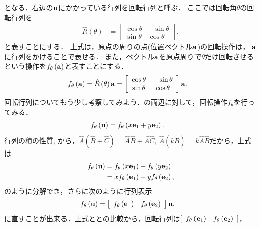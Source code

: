 %
となる．右辺の${\bf u}$にかかっている行列を回転行列と呼ぶ．
ここでは回転角$\theta$の回転行列を
\begin{align}
\hat{R}\left(\theta\right) & =\left[\begin{array}{cc}
\cos\theta & -\sin\theta\\
\sin\theta & \cos\theta
\end{array}\right], 
\end{align}
と表すことにする．
上式は，原点の周りの点(位置ベクトル${\bf a}$)の回転操作は，
${\bf a}$に行列をかけることで表せる．
また，ベクトル${\bf a}$を原点周りで$\theta$だけ回転させるという操作を$f_{\theta}\left({\bf a}\right)$と表すことにする．
\begin{align}
f_{\theta}\left({\bf a}\right) & = \hat{R}\left(\theta\right) {\bf a} 
=\left[\begin{array}{cc}
\cos\theta & -\sin\theta\\
\sin\theta & \cos\theta
\end{array}\right]{\bf a}. \label{LA:ftheta}
\end{align}
回転行列についてもう少し考察してみよう．の両辺に対して，回転操作$f_{\theta}$を行ってみる．
\begin{align}
f_{\theta}\left({\bf u}\right) & =f_{\theta}\left(x{\bf e}_{1}+y{\bf e}_{2}\right).
\end{align}
行列の積の性質, から，$\hat{A}\left(\hat{B}+\hat{C}\right) = \hat{A}\hat{B} + \hat{A}\hat{C},~\hat{A}\left(k\hat{B}\right) = k\hat{A}\hat{B}$だから，上式は
\begin{align}
f_{\theta}\left({\bf u}\right) 
& = f_{\theta}\left(x{\bf e}_{1}\right) +  f_{\theta}\left(y{\bf e}_{2}\right)\notag\\
& = xf_{\theta}\left({\bf e}_{1}\right)+yf_{\theta}\left({\bf e}_{2}\right),
\end{align}
のように分解でき，さらに次のように行列表示
\begin{align}
f_{\theta}\left({\bf u}\right) & =
\left[\begin{array}{cc} f_{\theta}\left({\bf e}_{1}\right) & f_{\theta}\left({\bf e}_{2}\right)\end{array}\right]{\bf u}, \label{LA:ftheta_unitconv}
\end{align}
に直すことが出来る．上式ととの比較から，回転行列は$[\begin{array}{cc} f_{\theta}\left({\bf e}_{1}\right) & f_{\theta}\left({\bf e}_{2}\right)\end{array}]$，
